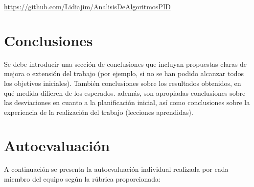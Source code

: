 \documentclass[a4paper]{article}
\begin{document}
\begin{center}
\url{https://github.com/Lidiajim/AnalisisDeAlgoritmosPID}
\end{center}
\newpage

\section{Conclusiones}

Se debe introducir una sección de conclusiones que incluyan propuestas claras de mejora o extensión del trabajo (por ejemplo, si no se han podido alcanzar todos los objetivos iniciales). También conclusiones sobre los resultados obtenidos, en qué medida difieren de los esperados. además, son apropiadas conclusiones sobre las desviaciones en cuanto a la planificación inicial, así como conclusiones sobre la experiencia de la realización del trabajo (lecciones aprendidas).
\newpage
\section{Autoevaluación}
A continuación se presenta la autoevaluación individual realizada por cada miembro del equipo según la rúbrica proporcionada:
\end{document}
